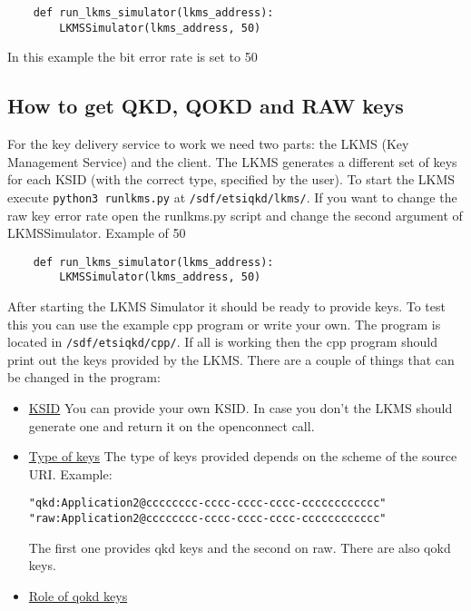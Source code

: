 \begin{refsection}
\begin{verbatim}
	def run_lkms_simulator(lkms_address):
		LKMSSimulator(lkms_address, 50)
\end{verbatim}


In this example the bit error rate is set to 50%

\subsection{How to get QKD, QOKD and RAW keys}

For the key delivery service to work we need two parts: the LKMS (Key Management Service) and the client.
The LKMS generates a different set of keys for each KSID (with the correct type, specified by the user). 
To start the LKMS execute \texttt{python3 run\textunderscore lkms.py} at \texttt{/sdf/etsi\textunderscore qkd/lkms/}. If you want to change the raw key error rate open 
the run\textunderscore lkms.py script and change the second argument of LKMSSimulator. Example of 50%
\begin{verbatim}
	def run_lkms_simulator(lkms_address):
		LKMSSimulator(lkms_address, 50)
\end{verbatim}

After starting the LKMS Simulator it should be ready to provide keys. To test this you can use the example cpp program or write your own. The program is located in \texttt{/sdf/etsi\textunderscore qkd/cpp/}. If all is working then the cpp program should print out the keys provided by the LKMS. There are a couple of things that can be changed in the program:

\begin{itemize}
	\item\underline{KSID}
		You can provide your own KSID. In case you don't the LKMS should generate one and return it on the open\textunderscore connect call.

	\item\underline{Type of keys}
		The type of keys provided depends on the scheme of the source URI. Example:

		\texttt{"qkd:Application2@cccccccc-cccc-cccc-cccc-cccccccccccc"}
		\texttt{"raw:Application2@cccccccc-cccc-cccc-cccc-cccccccccccc"}

		The first one provides qkd keys and the second on raw. There are also qokd keys.

	\item\underline{Role of qokd keys}	


\end{itemize}
\end{refsection}
